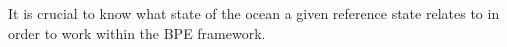 It is crucial to know what state of the ocean a given reference state relates to in order to work within the BPE framework. 

